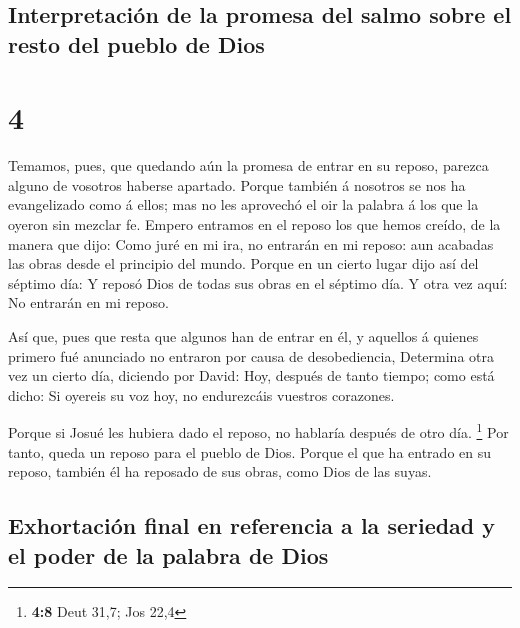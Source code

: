 \hypertarget{interpretaciuxf3n-de-la-promesa-del-salmo-sobre-el-resto-del-pueblo-de-dios}{%
\subsection{Interpretación de la promesa del salmo sobre el resto del
pueblo de
Dios}\label{interpretaciuxf3n-de-la-promesa-del-salmo-sobre-el-resto-del-pueblo-de-dios}}

\hypertarget{section-3}{%
\section{4}\label{section-3}}

 Temamos, pues, que quedando aún la promesa de entrar en
su reposo, parezca alguno de vosotros haberse apartado. 
Porque también á nosotros se nos ha evangelizado como á ellos; mas no
les aprovechó el oir la palabra á los que la oyeron sin mezclar fe.
 Empero entramos en el reposo los que hemos creído, de la
manera que dijo: Como juré en mi ira, no entrarán en mi reposo: aun
acabadas las obras desde el principio del mundo.  Porque
en un cierto lugar dijo así del séptimo día: Y reposó Dios de todas sus
obras en el séptimo día.  Y otra vez aquí: No entrarán en
mi reposo.

 Así que, pues que resta que algunos han de entrar en él,
y aquellos á quienes primero fué anunciado no entraron por causa de
desobediencia,  Determina otra vez un cierto día, diciendo
por David: Hoy, después de tanto tiempo; como está dicho: Si oyereis su
voz hoy, no endurezcáis vuestros corazones.

 Porque si Josué les hubiera dado el reposo, no hablaría
después de otro día. \footnote{\textbf{4:8} Deut 31,7; Jos 22,4}
 Por tanto, queda un reposo para el pueblo de Dios.
 Porque el que ha entrado en su reposo, también él ha
reposado de sus obras, como Dios de las suyas.

\hypertarget{exhortaciuxf3n-final-en-referencia-a-la-seriedad-y-el-poder-de-la-palabra-de-dios}{%
\subsection{Exhortación final en referencia a la seriedad y el poder de
la palabra de
Dios}\label{exhortaciuxf3n-final-en-referencia-a-la-seriedad-y-el-poder-de-la-palabra-de-dios}}

